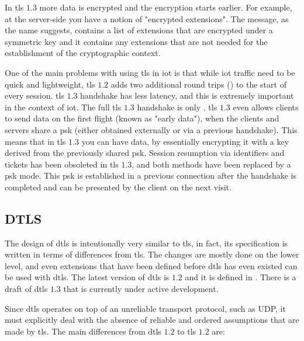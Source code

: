 \documentclass{llncs}
\begin{document}
In \gls{tls} $1.3$ more data is encrypted and the encryption starts earlier. For example,
at the server-side you have a notion of "encrypted extensions". The 
message, as the name suggests, contains a list of extensions that are encrypted
under a symmetric key and it contains any extensions that are not needed
for the establishment of the cryptographic context.

One of the main problems with using \gls{tls} in \gls{iot} is that while \gls{iot}
traffic need to be quick and lightweight, \gls{tls} $1.2$ adds two additional
round trips () to the start of every session. \gls{tls} $1.3$ handshake has less latency,
and this is extremely important in the context of \gls{iot}.
The full \gls{tls} $1.3$ handshake is only . \gls{tls} $1.3$ even allows
clients to send data on the first flight (known as "early data"), when the clients
and servers share a \gls{psk} (either obtained externally or via a previous handshake).
This means that in \gls{tls} $1.3$ you can have  data, by essentially
encrypting it with a key derived from the previously shared \gls{psk}. Session resumption
via identifiers and tickets has been obsoleted in \gls{tls} $1.3$, and both methods
have been replaced by a \gls{psk} mode. This \gls{psk} is established in a previous
connection after the handshake is completed and can be presented by the client
on the next visit.

%
\subsection{DTLS}

The design of \gls{dtls} is intentionally very similar to \gls{tls}, in fact, its specification is written
in terms of differences from \gls{tls}. The changes are mostly done on the lower level,
and even extensions that have been defined before \gls{dtls} has even existed can be
used with \gls{dtls}. The latest version of \gls{dtls} is $1.2$ and it is defined
in \cite{RFC6347}. There is a draft of \gls{dtls} $1.3$
\cite{I-D.ietf-tls-dtls13} that is currently under active development.

Since \gls{dtls} operates on top of an unreliable transport protocol, such as
UDP, it must explicitly deal with the absence of reliable and ordered assumptions
that are made by \gls{tls}. The main differences from \gls{dtls} $1.2$ to \gls{tls} $1.2$ are:
\end{document}
